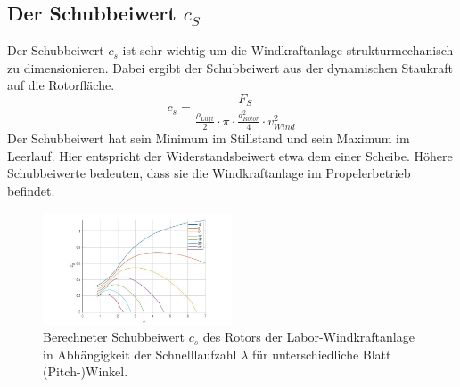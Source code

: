 \subsection{Der Schubbeiwert \texorpdfstring{$c_S$}{}}
Der Schubbeiwert $c_{s}$ ist sehr wichtig um die Windkraftanlage strukturmechanisch zu dimensionieren.  Dabei ergibt der Schubbeiwert aus der dynamischen Staukraft auf die Rotorfläche.
\begin{equation}
  c_{s}= \frac{F_{S}}{\frac{\rho_{Luft}}{2}\cdot \pi \cdot \frac{d^2_{Rotor}}{4} \cdot v^2_{Wind}}
    \label{eq:Schubbeiwert_cs}
\end{equation}
Der Schubbeiwert hat sein Minimum im Stillstand und sein Maximum im Leerlauf. Hier entspricht der Widerstandsbeiwert etwa dem einer Scheibe. Höhere Schubbeiwerte bedeuten, dass sie die Windkraftanlage im Propelerbetrieb befindet.\cite{Anleitung}
\begin{figure}[!ht]
    \centering
    \includegraphics[width=0.5\textwidth]{Abbildungen/cszulambda.jpg}
    \caption{Berechneter Schubbeiwert $c_{s}$ des Rotors der Labor-Windkraftanlage in Abhängigkeit der Schnelllaufzahl $\lambda$ für unterschiedliche Blatt (Pitch-)Winkel.\cite{Anleitung}}
    \label{fig:cszulambda}
\end{figure}
